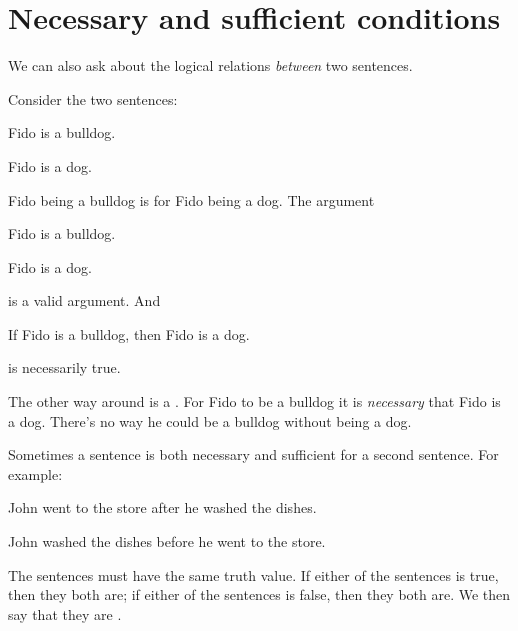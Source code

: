 \section{Necessary and sufficient conditions}\label{s.Nec Sufficient Conditions}
We can also ask about the logical relations \emph{between} two sentences. 

Consider the two sentences:
\begin{earg}
\item Fido is a bulldog.
\item Fido is a dog.
\end{earg}
Fido being a bulldog is  for Fido being a dog.
The argument 
\begin{earg}
\item Fido is a bulldog.
\item[\therefore] Fido is a dog.
\end{earg} is a valid argument. And 
\begin{earg}
\item[] If Fido is a bulldog, then Fido is a dog.
\end{earg}is necessarily true.


The other way around is a . For Fido to be a bulldog it is \emph{necessary} that Fido is a dog. There's no way he could be a bulldog without being a dog. 





Sometimes a sentence is both necessary and sufficient for a second sentence. For example:
\begin{earg}
\item[] John went to the store after he washed the dishes.
\item[] John washed the dishes before he went to the store.
\end{earg}
The sentences must have the same truth value. 
 If either of the sentences is true, then they both are; if either of the sentences is false, then they both are. We then say that they are .


